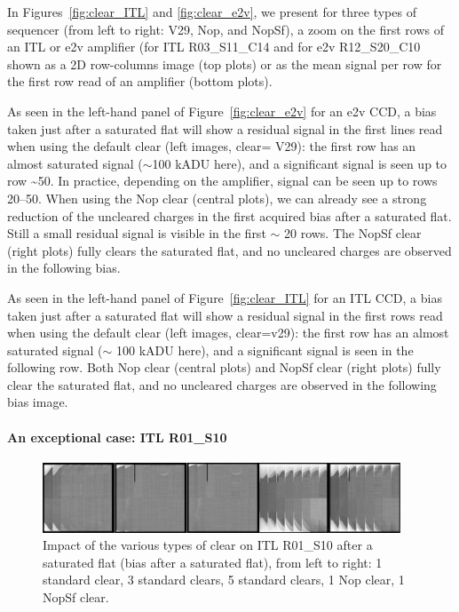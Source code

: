 



In Figures~\ref{fig:clear_ITL} and \ref{fig:clear_e2v}, we present for three types of sequencer (from left to
right: V29, Nop, and NopSf), a zoom on the first rows of an ITL or e2v
amplifier (for ITL R03\_S11\_C14 and for e2v
R12\_S20\_C10 shown as a 2D row-columns
image (top plots) or as the mean signal per row for the first row
read of an amplifier (bottom plots).

As seen in the left-hand panel of Figure~\ref{fig:clear_e2v}
for an e2v CCD, a bias taken just after a saturated flat will show a
residual signal in the first lines read when using the default clear
(left images, clear= V29): the first row has an almost saturated signal
($\sim$100 kADU here), and a significant signal is seen up
to row \textasciitilde50. In practice, depending on the 
amplifier, signal can be seen up to rows 20--50. When using the Nop clear
(central plots), we can already see a strong reduction of the uncleared
charges in the first acquired bias after a saturated flat.  Still a small
residual signal is visible in the first $\sim$ 20 rows. The
NopSf clear (right plots) fully clears the saturated flat, and no
uncleared charges are observed in the following bias.

As seen in the left-hand panel of Figure~\ref{fig:clear_ITL}
for an ITL CCD, a bias taken just after a saturated flat will show a
residual signal in the first rows read when using the default clear
(left images, clear=v29): the first row has an almost saturated signal
($\sim$ 100 kADU here), and a significant signal is seen in
the following row. Both Nop clear (central plots) and NopSf clear
(right plots) fully clear the saturated flat, and no uncleared charges
are observed in the following bias image.

\paragraph{An exceptional case: ITL R01\_S10}\label{results-on-itl-r01s10}

\begin{figure}[ht]
\begin{centering}
\includegraphics[width=0.95\textwidth]{figures/Clear_R01_S10.png}
\end{centering}
\caption{Impact of the various types of clear on ITL
R01\_S10 after a saturated flat (bias after a saturated flat), from left
to right: 1 standard clear, 3 standard clears, 5 standard clears, 1 Nop
clear, 1 NopSf clear.}
\label{fig:clears_R01_S10}
\end{figure}

